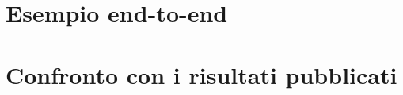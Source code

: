 \section{Esempio end-to-end}
\label{sec:ris-esempio}
%
%


\section{Confronto con i risultati pubblicati}
\label{sec:ris-confronto}
%
%


